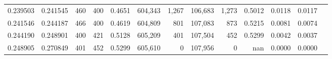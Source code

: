 \begin{tabular}{rrrrrrrrrrrrr}
0.239503 & 0.241545 &   460 & 400 &                                     0.4651 & 604,343 &   1,267 & 106,683 &   1,273 & 0.5012 & 0.0118 & 0.0117 \\
0.241546 & 0.244187 &   466 & 400 &                                     0.4619 & 604,809 &     801 & 107,083 &     873 & 0.5215 & 0.0081 & 0.0074 \\
0.244190 & 0.248901 &   400 & 421 &                                     0.5128 & 605,209 &     401 & 107,504 &     452 & 0.5299 & 0.0042 & 0.0037 \\
0.248905 & 0.270849 &   401 & 452 &                                     0.5299 & 605,610 &       0 & 107,956 &       0 &    nan & 0.0000 & 0.0000 \\
\bottomrule
\end{tabular}
